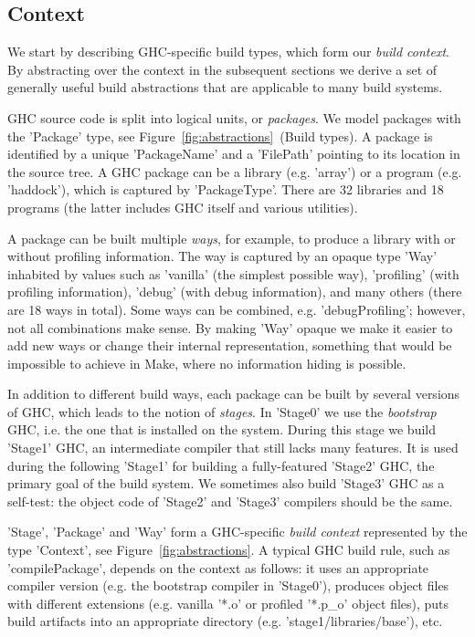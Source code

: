 \subsection{\textsf{Context}\label{sec:ghc-context}}

We start by describing GHC-specific build types, which form our \emph{build
context}. By abstracting over the context in the subsequent sections we derive a
set of generally useful build abstractions that are applicable to many build
systems.

GHC source code is split into logical units, or \emph{packages}. We model
packages with the \lst'Package' type, see
Figure~\ref{fig:abstractions}~(Build types). A package is identified by a
unique \lst'PackageName' and a \lst'FilePath' pointing to its location in the
source tree. A GHC package can be a library (e.g. \lst'array') or a program
(e.g. \lst'haddock'), which is captured by \lst'PackageType'. There are
32 libraries and 18 programs (the latter includes GHC itself and various utilities).

A package can be built multiple \emph{ways}, for example, to produce a library
with or without profiling information. The way is captured by an opaque
type \lst'Way' inhabited by values such as \lst'vanilla' (the simplest
possible way), \lst'profiling' (with profiling information), \lst'debug'
(with debug information), and many others (there are 18 ways in total). Some
ways can be combined, e.g. \lst'debugProfiling'; however, not all combinations
make sense. By making \lst'Way' opaque we make it easier
to add new ways or change their internal representation, something that would be
impossible to achieve in Make, where no information hiding is possible.

In addition to different build ways, each package can be built by several
versions of GHC, which leads to the notion of \emph{stages}.
In \lst'Stage0' we use the \emph{bootstrap} GHC, i.e. the one that is
installed on the system. During this stage we build \lst'Stage1' GHC, an
intermediate compiler that still lacks many features. It is used during the
following \lst'Stage1' for building a fully-featured \lst'Stage2' GHC, the
primary goal of the build system. We sometimes also build \lst'Stage3' GHC as
a self-test: the object code of \lst'Stage2' and \lst'Stage3' compilers
should be the same.

\lst'Stage', \lst'Package' and \lst'Way' form a GHC-specific
\emph{build context} represented by the type
\lst'Context', see Figure~\ref{fig:abstractions}. A typical GHC
build rule, such as \lst'compilePackage', depends on the context as follows: it uses an appropriate compiler version (e.g. the bootstrap compiler in \lst'Stage0'), produces object files with different extensions (e.g. vanilla
\lst'*.o' or profiled \lst'*.p_o' object files), puts build artifacts
into an appropriate directory (e.g. \lst'stage1/libraries/base'), etc.

